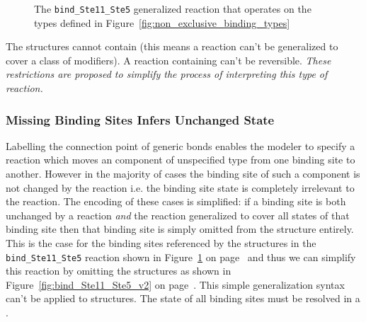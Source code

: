\documentclass{cekarticle}
\begin{document}
\begin{figure}[h]
  \caption{The \texttt{bind\_Ste11\_Ste5} generalized reaction that operates on the types defined in
  Figure~\ref{fig:non_exclusive_binding_types}}
  \label{fig:bind_Ste11_Ste5}
\end{figure}

The  structures cannot contain
 (this means a reaction can't be generalized
to cover a class of modifiers).  A reaction containing
 can't be reversible.  \emph{These
restrictions are proposed to simplify the process of interpreting
this type of reaction.}

\subsubsection{Missing Binding Sites Infers Unchanged State}

Labelling the connection point of generic bonds enables the
modeler to specify a reaction which moves an component of
unspecified type from one binding site to another.  However in the
majority of cases the binding site of such a component is not
changed by the reaction i.e. the binding site state is completely
irrelevant to the reaction.  The encoding of these cases is
simplified:  if a binding site is both unchanged by a reaction
\emph{and} the reaction generalized to cover all states of that
binding site then that binding site is simply omitted from the
 structure entirely. This is the case for the
binding sites referenced by the  structures in
the \texttt{bind\_Ste11\_Ste5} reaction shown in
Figure~\ref{fig:bind_Ste11_Ste5} on
page~\pageref{fig:bind_Ste11_Ste5} and thus we can simplify this
reaction by omitting the  structures as shown
in Figure~\ref{fig:bind_Ste11_Ste5_v2} on
page~\pageref{fig:bind_Ste11_Ste5_v2}. This simple generalization
syntax can't be applied to  structures. The
state of all binding sites must be resolved in a
.
\end{document}
